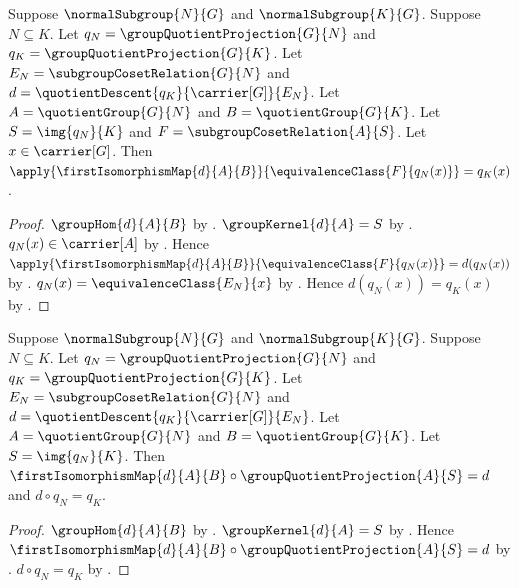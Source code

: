 \begin{proposition}\label{group_third_isomorphism_map_apply}
    Suppose $\normalSubgroup{N}{G}$ and $\normalSubgroup{K}{G}$.
    Suppose $N\subseteq K$.
    Let $q_N=\groupQuotientProjection{G}{N}$ and
        $q_K=\groupQuotientProjection{G}{K}$.
    Let $E_N=\subgroupCosetRelation{G}{N}$ and
        $d=\quotientDescent{q_K}{\carrier[G]}{E_N}$.
    Let $A=\quotientGroup{G}{N}$ and $B=\quotientGroup{G}{K}$.
    Let $S=\img{q_N}{K}$ and
        $F=\subgroupCosetRelation{A}{S}$.
    Let $x\in\carrier[G]$.
    Then
        $\apply{\firstIsomorphismMap{d}{A}{B}}{
            \equivalenceClass{F}{q_N(x)}}=q_K(x)$.
\end{proposition}
\begin{proof}
    $\groupHom{d}{A}{B}$ by
        .
    $\groupKernel{d}{A}=S$ by
        .
    $q_N(x)\in\carrier[A]$ by
        .
    Hence
        $\apply{\firstIsomorphismMap{d}{A}{B}}{
            \equivalenceClass{F}{q_N(x)}}=d(q_N(x))$ by
        .
    $q_N(x)=\equivalenceClass{E_N}{x}$ by
        .
    Hence $d(q_N(x))=q_K(x)$ by
        .
\end{proof}

\begin{theorem}\label{group_third_isomorphism_factorization}
    Suppose $\normalSubgroup{N}{G}$ and $\normalSubgroup{K}{G}$.
    Suppose $N\subseteq K$.
    Let $q_N=\groupQuotientProjection{G}{N}$ and
        $q_K=\groupQuotientProjection{G}{K}$.
    Let $E_N=\subgroupCosetRelation{G}{N}$ and
        $d=\quotientDescent{q_K}{\carrier[G]}{E_N}$.
    Let $A=\quotientGroup{G}{N}$ and $B=\quotientGroup{G}{K}$.
    Let $S=\img{q_N}{K}$.
    Then
        $\firstIsomorphismMap{d}{A}{B}\circ
            \groupQuotientProjection{A}{S}=d$ and
        $d\circ q_N=q_K$.
\end{theorem}
\begin{proof}
    $\groupHom{d}{A}{B}$ by
        .
    $\groupKernel{d}{A}=S$ by
        .
    Hence
        $\firstIsomorphismMap{d}{A}{B}\circ
            \groupQuotientProjection{A}{S}=d$ by
        .
    $d\circ q_N=q_K$ by
        .
\end{proof}

